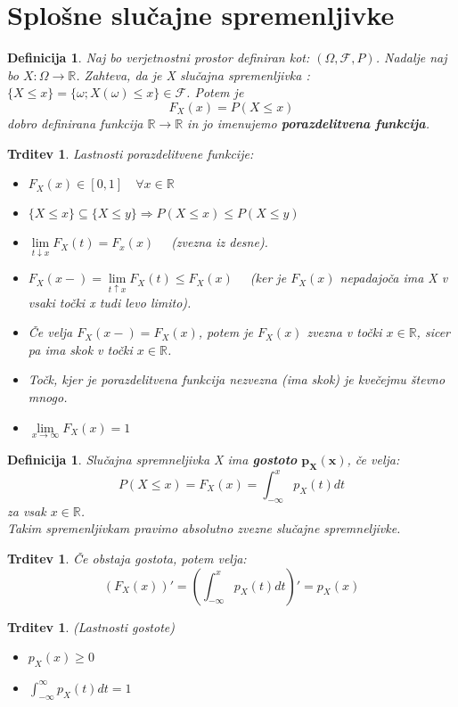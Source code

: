 \documentclass[11pt]{article}
\newtheorem{Trditev}[Izrek]{{\sc Trditev}}
\newtheorem{Definicija}[Izrek]{{\sc Definicija}}
\begin{document}
\section{Splošne slučajne spremenljivke}
\begin{Definicija}
	Naj bo verjetnostni prostor definiran kot: $(\Omega, \mathcal{F},P)$. Nadalje naj bo $X: \Omega \to \mathbb{R}$. Zahteva, da je X slučajna spremenljivka : $\{ X\le x\} = \{\omega ; X(\omega) \le x\} \in \mathcal{F}$. Potem je $$F_X(x)  = P(X \le x)$$ dobro definirana funkcija $\mathbb{R}\to \mathbb{R}$ in jo imenujemo \textbf{porazdelitvena funkcija}.
\end{Definicija}
\begin{Trditev}
	Lastnosti porazdelitvene funkcije:
	\begin{itemize}
		\item
		$F_X(x) \in [0,1] \quad \forall x\in \mathbb{R}$
		\item
		$\{X \le x\} \subseteq \{X \le y \} \Rightarrow P(X \le x) \le P(X \le y) $
		\item
		$\lim\limits_{t \downarrow x}{F_X(t)} = F_x(x) \quad$ (zvezna iz desne).
		\item
		$F_X(x-) = \lim\limits_{t\uparrow x}F_X(t) \le F_X(x) \quad$
		(ker je $F_X(x)$ nepadajoča ima X v vsaki točki x tudi levo limito).
		
		\item
		Če velja $F_X(x -) = F_X(x)$, potem je $F_X(x)$ zvezna v točki $x\in\mathbb{R}$, sicer pa ima skok v točki $x\in \mathbb{R}$.
		\item
		Točk, kjer je porazdelitvena funkcija nezvezna (ima skok) je kvečejmu števno mnogo.
		\item
		$\lim\limits_{x \to \infty}{F_X(x)} = 1$
	\end{itemize}
\end{Trditev}
\begin{Definicija}
	Slučajna spremneljivka X ima\textbf{ gostoto} $\mathbf{p_X(x)}$, če velja:
	$$P(X\le x) = F_X(x) = \int_{-\infty}^{x}{p_X(t)dt}$$ za vsak $x\in \mathbb{R}$.
	\\
	Takim spremenljivkam pravimo absolutno zvezne slučajne spremneljivke. 
\end{Definicija}
\begin{Trditev}
	Če obstaja gostota, potem velja:
	$$\left( F_X(x) \right)' = \left(\int_{-\infty}^{x}{p_X(t)dt}\right)'= p_X(x)$$
\end{Trditev}
\begin{Trditev}(Lastnosti gostote)
\begin{itemize}
	\item
	$p_X(x) \ge 0$
	\item	
	$\int_{-\infty}^{\infty}{p_X(t) dt} = 1 $
\end{itemize}
\end{Trditev}
\end{document}
